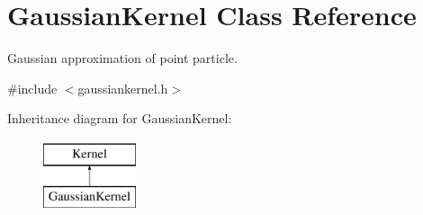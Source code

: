 \hypertarget{classGaussianKernel}{\section{\-Gaussian\-Kernel \-Class \-Reference}
\label{classGaussianKernel}
}


\-Gaussian approximation of point particle.  




{\ttfamily \#include $<$gaussiankernel.\-h$>$}

\-Inheritance diagram for \-Gaussian\-Kernel\-:\begin{figure}[H]
\begin{center}
\leavevmode
\includegraphics[height=2.000000cm]{classGaussianKernel}
\end{center}
\end{figure}
